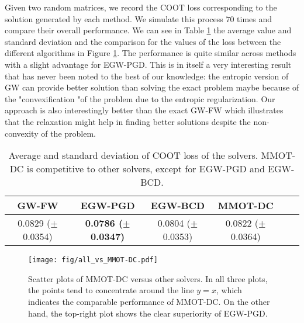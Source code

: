 \documentclass{article}
\begin{document}
Given two random matrices, we record the COOT loss corresponding to the solution generated by each method. 
We simulate this process $70$ times and compare their overall performance. We can see in Table \ref{tab:gw} the average value and 
standard deviation and the comparison for the values of the loss between the different algorithms in Figure \ref{fig:gw}.
The performance is quite similar across methods with a  slight advantage for EGW-PGD. This is in itself a very
interesting result that has never been noted to the best of our knowledge: the entropic version of GW can
provide better solution than solving the exact problem maybe because of the
"convexification "of the problem due to the entropic regularization. Our approach
is also interestingly better than the exact GW-FW which illustrates that the
relaxation might help in finding better solutions despite the non-convexity of the
problem.
\begin{table}[t]
 
  \begin{center}
    \begin{small}
      \begin{sc}
        \begin{tabular}{|c|c|c|c|c|c|}
          \hline
          GW-FW & EGW-PGD & EGW-BCD & MMOT-DC \\
          \hline
          0.0829 ($\pm$ 0.0354) & \textbf{0.0786 ($\pm$ 0.0347)} & 0.0804 ($\pm$ 0.0353) & 0.0822 ($\pm$ 0.0364) \\
          \hline
        \end{tabular}
      \end{sc}
    \end{small}
  \end{center}
  \caption{Average and standard deviation of COOT loss of the solvers. MMOT-DC is competitive to other solvers, 
  except for EGW-PGD and EGW-BCD. 
  \label{tab:gw}}
\end{table}

\begin{figure}[t]
	\centering
	\texttt{[image: fig/all\_vs\_MMOT-DC.pdf]}
	\caption{Scatter plots of MMOT-DC versus other solvers. In all three plots, the points tend to concentrate around the line $y=x$, 
  which indicates the comparable performance of MMOT-DC. On the other hand, the top-right plot shows the clear superiority of EGW-PGD.}
	\label{fig:gw}
\end{figure}
\end{document}
